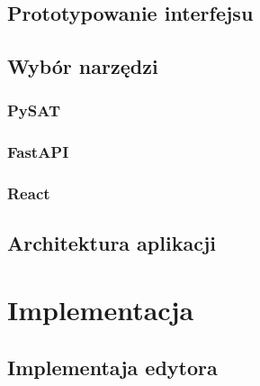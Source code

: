\documentclass[a4paper,12pt,oneside]{book}
\theoremstyle{definition}
\begin{document}
\section{Prototypowanie interfejsu}

\lipsum[1]

\lipsum[2]

\lipsum[3]

\section{Wybór narzędzi}

\subsection{PySAT}

\lipsum[1]

\lipsum[2]

\lipsum[3]

\subsection{FastAPI}

\lipsum[1]

\lipsum[2]

\lipsum[3]

\subsection{React}

\lipsum[1]

\lipsum[2]

\lipsum[3]

\section{Architektura aplikacji}

\lipsum[1]

\lipsum[2]

\lipsum[3]

\chapter{Implementacja}

\section{Implementaja edytora}

\lipsum[1]
\end{document}
